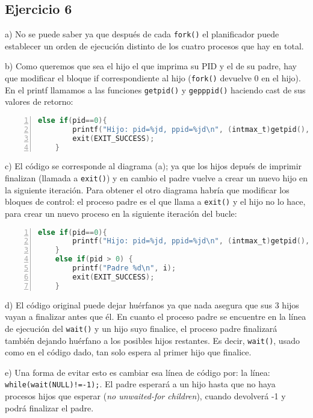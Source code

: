 \documentclass{article}
\begin{document}
\subsection*{Ejercicio 6}

a) No se puede saber ya que después de cada \texttt{fork()} el planificador puede establecer un orden de ejecución distinto de los cuatro procesos que hay en total.

b) Como queremos que sea el hijo el que imprima su PID y el de su padre, hay que modificar el bloque if correspondiente al hijo (\texttt{fork()} devuelve 0 en el hijo). En el printf llamamos a las funciones \texttt{getpid()} y \texttt{gepppid()} haciendo cast de sus valores de retorno:

\begin{lstlisting}[language=C, numbers=left]
    else if(pid==0){
        printf("Hijo: pid=%jd, ppid=%jd\n", (intmax_t)getpid(), (intmax_t)getppid());
        exit(EXIT_SUCCESS);
    }
\end{lstlisting}

c) El código se corresponde al diagrama (a); ya que los hijos depués de imprimir finalizan (llamada a \texttt{exit()}) y en cambio el padre vuelve a crear un nuevo hijo en la siguiente iteración. Para obtener el otro diagrama habría que modificar los bloques de control: el proceso padre es el que llama a \texttt{exit()} y el hijo no lo hace, para crear un nuevo proceso en la siguiente iteración del bucle:

\begin{lstlisting}[language=C, numbers=left]
    else if(pid==0){
        printf("Hijo: pid=%jd, ppid=%jd\n", (intmax_t)getpid(), (intmax_t)getppid());
    }
    else if(pid > 0) {
        printf("Padre %d\n", i);
        exit(EXIT_SUCCESS);
    }
\end{lstlisting}

d) El código original puede dejar huérfanos ya que nada asegura que sus 3 hijos vayan a finalizar antes que él. En cuanto el proceso padre se encuentre en la línea de ejecución del \texttt{wait()} y un hijo suyo finalice, el proceso padre finalizará también dejando huérfano a los posibles hijos restantes. Es decir, \texttt{wait()}, usado como en el código dado, tan solo espera al primer hijo que finalice.

e) Una forma de evitar esto es cambiar esa línea de código por: la línea: \texttt{while(wait(NULL)!=-1);}. El padre esperará a un hijo hasta que no haya procesos hijos que esperar (\textit{no unwaited-for children}), cuando devolverá -1 y podrá finalizar el padre.  
\end{document}
